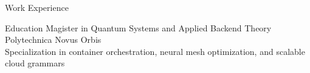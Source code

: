 \documentclass{resume}
\begin{document}
\begin{rSection}{Work Experience}
  \end{rSection}


  \begin{rSection}{Education}
    {Magister in Quantum Systems and Applied Backend Theory}\\
    {Polytechnica Novus Orbis}\\
    {Specialization in container orchestration, neural mesh optimization, and scalable cloud grammars}\\


  \end{rSection}
\end{document}
